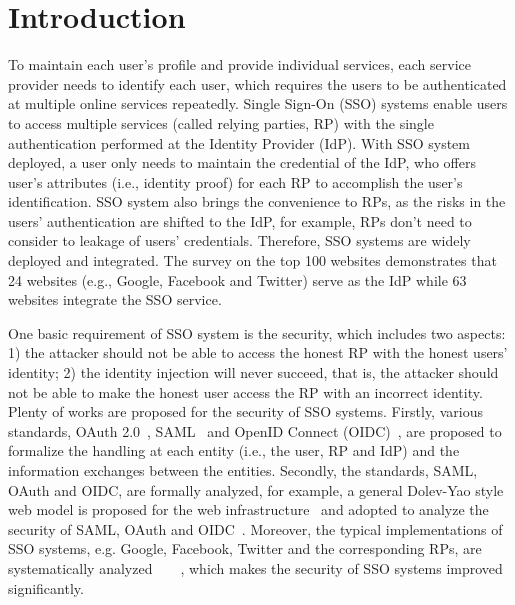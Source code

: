 \section{Introduction}
\label{sec:intro}
To maintain each user's profile and provide individual services, each service provider needs to identify each user, which requires the users to be authenticated at multiple online services repeatedly. 
Single Sign-On (SSO) systems enable users to access multiple services (called relying parties, RP) with the single authentication performed at the Identity Provider (IdP). With SSO system deployed, a user only needs to maintain the credential of the IdP, who offers user's attributes (i.e., identity proof) for each RP to accomplish the user's identification. 
SSO system also brings the convenience to RPs, as the risks in the users' authentication are shifted to the IdP, for example, RPs don't need to consider to leakage of users' credentials. 
Therefore, SSO systems are widely deployed and integrated. 
The survey on the top 100 websites demonstrates that 24 websites (e.g., Google, Facebook and Twitter) serve as the IdP while 63 websites integrate the SSO service.  



One basic requirement of SSO system is the security, which includes two aspects: 1) the attacker should not be able to access the honest RP with the honest users' identity; 2) the identity injection will never succeed, that is, the attacker should not be able to make the honest user access the RP with an incorrect identity. Plenty of works are proposed for the security of SSO systems. 
Firstly, various standards,  OAuth 2.0~\cite{rfc6749}, SAML~\cite{SAML} and OpenID Connect (OIDC)~\cite{OpenIDConnect}, are proposed to formalize the handling at each entity (i.e.,  the user, RP and IdP)  and the information exchanges between the entities. 
Secondly, the standards, SAML, OAuth and OIDC, are formally analyzed, for example, a general Dolev-Yao style web model is proposed for the web infrastructure~\cite{webmodel} and adopted to analyze the security of SAML, OAuth and OIDC~\cite{}.
Moreover, the typical implementations of SSO systems, e.g. Google, Facebook, Twitter and the corresponding RPs, are systematically analyzed~\cite{WangCW12}~\cite{FettKS16}~\cite{ZhouE14}~\cite{WangZLG16}, which makes  the security of SSO systems improved significantly.


